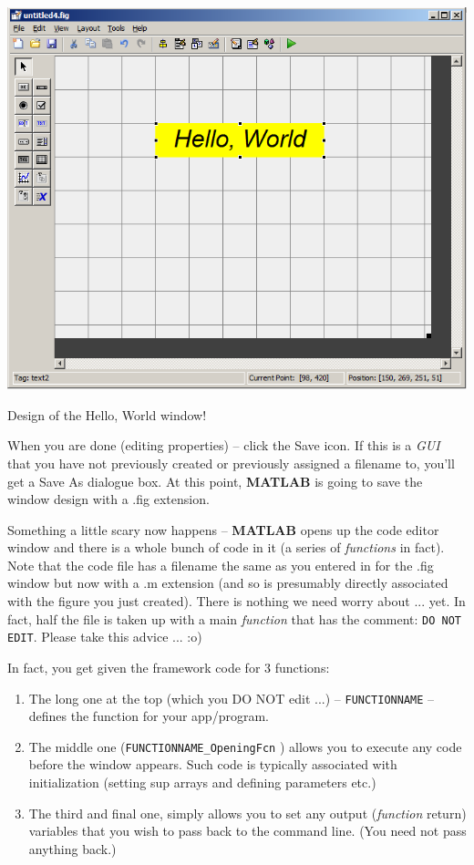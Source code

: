 \documentclass{tufte-book} %
\begin{document}
\begin{marginfigure}[-0.0in]
\includegraphics[width=\linewidth]{chGUI-HelloWorld.png}
\caption{Design of the Hello, World window!}
\label{fig:chGUI-HelloWorld}
\end{marginfigure}

When you are done (editing properties) -- click the \textsf{Save} icon. If this is a \textit{GUI} that you have not previously created or previously assigned a filename to, you'll get a \textsf{Save As} dialogue box. At this point, \textbf{MATLAB} is going to save the window design with a \textsf{.fig} extension.

Something a little scary now happens -- \textbf{MATLAB} opens up the \textsf{code editor window} and there is a whole bunch of code in it (a series of \textit{functions} in fact). Note that the code file has a filename the same as you entered in for the \textsf{.fig} window but now with a \textsf{.m} extension (and so is presumably directly associated with the figure you just created). There is nothing we need worry about ... yet. In fact, half the file is taken up with a main \textit{function} that has the comment: \texttt{DO NOT EDIT}. Please take this advice ... :o)

In fact, you get given the framework code for 3 functions:

\begin{enumerate}[noitemsep]
\item The long one at the top (which you DO NOT edit ...) -- \texttt{FUNCTIONNAME} -- defines the function for your app/program.
\item  The middle one (\texttt{FUNCTIONNAME\_OpeningFcn} ) allows you to execute any code before the window appears. Such code is typically associated with initialization (setting sup arrays and defining parameters etc.)
\item The third and final one, simply allows you to set any output (\textit{function} return) variables that you wish to pass back to the command line. (You need not pass anything back.)
\end{enumerate}
\end{document}
